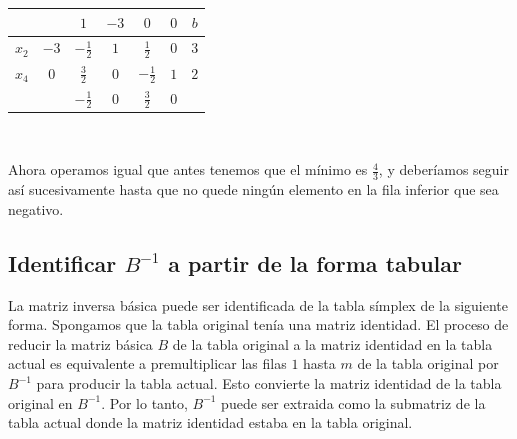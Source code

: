 \documentclass[PM.tex]{subfiles}
\begin{document}
\begin{tabular}{|c|c| c c| c c|c|}
\hline
 &            & $1$ & $-3$ & $0$ & $0$ & $b$  \\
 \hline
 $x_2$ & $-3$ & $-\frac{1}{2}$ & $1$ &   $\frac{1}{2}$ &   $0$ & $3$\\
  $x_4$ & $0$ & $\frac{3}{2}$ & $0$ &    $-\frac{1}{2}$ &  $1$ & $2$\\
 \hline
 &            & $\boxed{-\frac{1}{2}}$ & $0$ & $\frac{3}{2}$ & $0$ & \\
 \hline

\end{tabular}\

Ahora operamos igual que antes tenemos que el mínimo es $\frac{4}{3}$, y deberíamos seguir así sucesivamente hasta que no quede ningún elemento en la fila inferior que sea negativo.

\subsection{Identificar $B^{-1}$ a partir de la forma tabular}
La matriz inversa básica puede ser identificada de la tabla símplex de la siguiente forma. Spongamos que la tabla original tenía una matriz identidad.
El proceso de reducir la matriz básica $B$ de la tabla original a la matriz identidad en la tabla actual es equivalente a premultiplicar las filas $1$ hasta $m$ de la tabla original por $B^{-1}$ para producir la tabla actual.
Esto convierte la matriz identidad de la tabla original en $B^{-1}$.
Por lo tanto, $B^{-1}$ puede ser extraida como la submatriz de la tabla actual donde la matriz identidad estaba en la tabla original.
\end{document}
